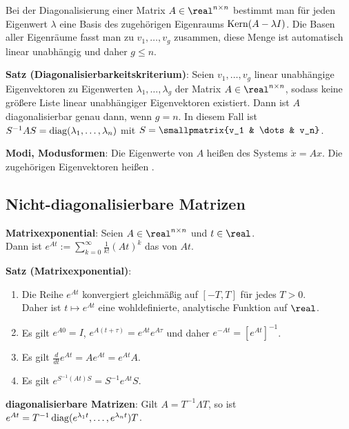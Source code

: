 \linie

Bei der Diagonalisierung einer Matrix $A \in \real^{n \times n}$ bestimmt man für jeden
Eigenwert $\lambda$ eine Basis des zugehörigen Eigenraums $\operatorname{Kern}(A - \lambda I)$.
Die Basen aller Eigenräume fasst man zu $v_1, \dotsc, v_g$ zusammen,
diese Menge ist automatisch linear unabhängig und daher $g \le n$.

\textbf{Satz (Diagonalisierbarkeitskriterium)}:
Seien $v_1, \dotsc, v_g$ linear unabhängige Eigenvektoren zu Eigenwerten
$\lambda_1, \dotsc, \lambda_g$ der Matrix $A \in \real^{n \times n}$,
sodass keine größere Liste linear unabhängiger Eigenvektoren existiert.
Dann ist $A$ diagonalisierbar genau dann, wenn $g = n$.
In diesem Fall ist $S^{-1} A S = \operatorname{diag}(\lambda_1, \dotsc, \lambda_n)$ mit
$S = \smallpmatrix{v_1 & \dots & v_n}$.

\textbf{Modi, Modusformen}:
Die Eigenwerte von $A$ heißen  des Systems $\dot{x} = Ax$.
Die zugehörigen Eigenvektoren heißen .

\subsection{%
    Nicht-diagonalisierbare Matrizen%
}

\textbf{Matrixexponential}:
Seien $A \in \real^{n \times n}$ und $t \in \real$.\\
Dann ist $e^{At} := \sum_{k=0}^\infty \frac{1}{k!} (At)^k$ das 
von $At$.

\textbf{Satz (Matrixexponential)}:
\begin{enumerate}
    \item
    Die Reihe $e^{At}$ konvergiert gleichmäßig auf $[-T, T]$ für jedes $T > 0$.\\
    Daher ist $t \mapsto e^{At}$ eine wohldefinierte, analytische Funktion auf $\real$.
    
    \item
    Es gilt $e^{A0} = I$, $e^{A(t + \tau)} = e^{At} e^{A\tau}$ und daher $e^{-At} = [e^{At}]^{-1}$.
    
    \item
    Es gilt $\frac{d}{dt} e^{At} = A e^{At} = e^{At} A$.
    
    \item
    Es gilt $e^{S^{-1} (At) S} = S^{-1} e^{At} S$.
\end{enumerate}

\textbf{diagonalisierbare Matrizen}:
Gilt $A = T^{-1} \Lambda T$, so ist
$e^{At} = T^{-1} \operatorname{diag}(e^{\lambda_1 t}, \dotsc, e^{\lambda_n t}) T$.

